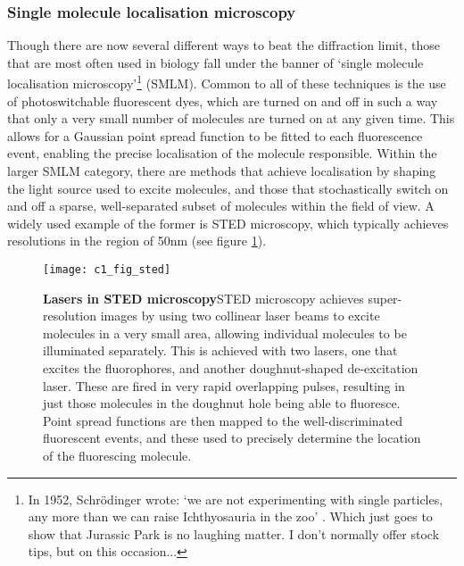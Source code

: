 \documentclass[a4paper,11pt,twoside,openright]{scrbook}
\begin{document}
\subsubsection{Single molecule localisation microscopy}
Though there are now several different ways to beat the diffraction limit, those that are most often used in biology fall under the banner of `single molecule localisation microscopy'\footnote{In 1952, Schrödinger wrote: `we are not experimenting with single particles, any more than we can raise Ichthyosauria in the zoo' \cite{Schrodinger1952}. Which just goes to show that Jurassic Park is no laughing matter. I don't normally offer stock tips, but on this occasion...} (SMLM). Common to all of these techniques is the use of photoswitchable fluorescent dyes, which are turned on and off in such a way that only a very small number of molecules are turned on at any given time. This allows for a Gaussian point spread function to be fitted to each fluorescence event, enabling the precise localisation of the molecule responsible. Within the larger SMLM category, there are methods that achieve localisation by shaping the light source used to excite molecules, and those that stochastically switch on and off a sparse, well-separated subset of molecules within the field of view. A widely used example of the former is STED microscopy, which typically achieves resolutions in the region of 50nm (see figure \ref{figure:sted}).

\begin{figure}[h]
\fcapsideright
    {\caption[Lasers in STED microscopy]{\sffamily\textbf{Lasers in STED microscopy}\newline \small STED microscopy achieves super-resolution images by using two collinear laser beams to excite molecules in a very small area, allowing individual molecules to be illuminated separately. This is achieved with two lasers, one that excites the fluorophores, and another doughnut-shaped de-excitation laser. These are fired in very rapid overlapping pulses, resulting in just those molecules in the doughnut hole being able to fluoresce. Point spread functions are then mapped to the well-discriminated fluorescent events, and these used to precisely determine the location of the fluorescing molecule.}\label{figure:sted}}
    {\texttt{[image: c1\_fig\_sted]}}
\end{figure}
\end{document}
